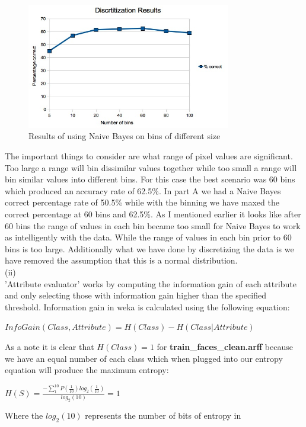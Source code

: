 \documentclass{report}
\begin{document}
\begin{figure}[h]
  \centering
  \includegraphics[height=55mm]{images/BiGraph.jpg}
  \caption{Results of using Naive Bayes on bins of different size}
  \label{fig}
\end{figure}
The important things to consider are what range of pixel values are
significant. Too large a range will bin dissimilar values together while
too small a range will bin similar values into different bins. For
this case the best scenario was 60 bins which produced an accuracy
rate of 62.5\%. In part A we had a Naive Bayes correct percentage rate
of 50.5\% while
with the binning we have maxed the correct percentage at 60 bins and
62.5\%. As I mentioned earlier it looks like after 60 bins the range
of values in each bin became too small for Naive Bayes to work as
intelligently with the data. While the range of values in each bin
prior to 60 bins is too large. Additionally what we have done by
discretizing the data is we have removed the assumption that this is a
normal distribution.\\
(ii)\\
'Attribute evaluator' works by computing the information gain of each
attribute and only selecting those with information gain higher than
the specified threshold. Information gain in weka is calculated using the
following equation:\\
\begin{center}
  \( InfoGain(Class,Attribute) = H(Class) - H(Class | Attribute)\)\\
\end{center}
As a note it is clear that $H(Class) = 1$ for {\bf
  train\_faces\_clean.arff} because we have an equal number of each
class which when plugged into our entropy equation will produce the
maximum entropy:
\begin{center}\(
H(S) = \frac{- \sum_{1}^{10} P(\frac{1}{10})log_{2}(\frac{1}{10})}
  {log_{2}(10)} = 1
\)\end{center}
Where the $log_{2}(10)$ represents the number of bits of entropy in
\end{document}
